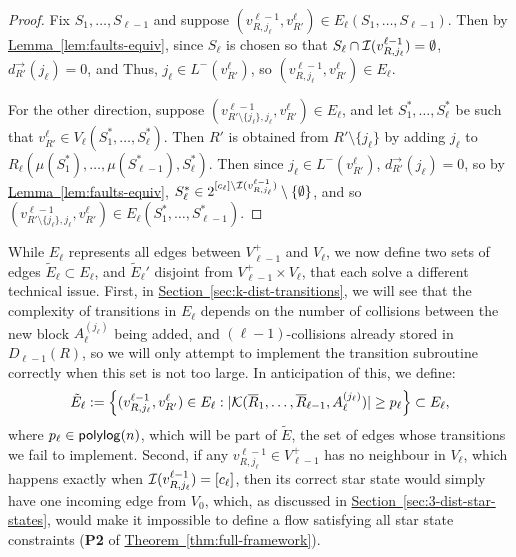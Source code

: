 \documentclass{theoretics}
\renewcommand{\sec}[1]{\hyperref[sec:#1]{Section~\ref*{sec:#1}}}
\newcommand{\thm}[1]{\hyperref[thm:#1]{Theorem~\ref*{thm:#1}}}
\newcommand{\lem}[1]{\hyperref[lem:#1]{Lemma~\ref*{lem:#1}}}
\renewcommand{\>}{\rangle}
\newcommand{\<}{\langle}
\renewcommand{\(}{\left(}
\renewcommand{\)}{\right)}
\begin{document}
\begin{proof}
Fix $S_1,\dots,S_{\ell-1}$ and suppose $(v_{R,j_{\ell}}^{\ell-1},v_{R'}^{\ell})\in {E}_{\ell}(S_1,\dots,S_{\ell-1})$. Then by \lem{faults-equiv}, since $S_{\ell}$ is chosen so that $S_{\ell}\cap {\cal I}(v_{R,j_{\ell}}^{\ell-1})=\emptyset$,
$d_{R'}^{\rightarrow}(j_{\ell})=0$, and Thus, $j_{\ell}\in L^-(v_{R'}^{\ell})$, so $(v_{R,j_{\ell}}^{\ell-1},v_{R'}^{\ell})\in E_{\ell}$.


For the other direction, suppose $\left(v^{\ell-1}_{R'\setminus\{j_{\ell}\},j_{\ell}},v^{\ell}_{R'}\right)\in E_{\ell}$, and let $S_1^*,\dots,S_{\ell}^*$ be such that $v^{\ell}_{R'}\in V_{\ell}(S_1^*,\dots,S_{\ell}^*)$. Then $R'$ is obtained from $R'\setminus\{j_{\ell}\}$ by adding $j_{\ell}$ to $R_{\ell}(\mu(S_1^*),\dots,\mu(S_{\ell-1}^*),S_{\ell}^*)$. Then since $j_{\ell}\in L^-(v_{R'}^{\ell})$, $d_{R'}^{\rightarrow}(j_{\ell})=0$, so by \lem{faults-equiv}, $S_{\ell}^*\in 2^{[c_{\ell}]\setminus{\cal I}(v_{R,j_{\ell}}^{\ell-1})}\setminus\{\emptyset\}$, and so $\left(v^{\ell-1}_{R'\setminus\{j_{\ell}\},j_{\ell}},v^{\ell}_{R'}\right)\in E_{\ell}(S_1^*,\dots,S_{\ell-1}^*)$.
\end{proof}
While $E_{\ell}$ represents all edges between $V_{\ell-1}^{+}$ and $V_{\ell}$, we now define two sets of edges $\tilde{E}_{\ell}\subset E_{\ell}$, and $\tilde{E}_{\ell}'$ disjoint from $V_{\ell-1}^+\times V_{\ell}$, that each solve a different technical issue. First, in \sec{k-dist-transitions}, we will see that the complexity of transitions in $E_{\ell}$ depends on the number of collisions between the new block $A_{\ell}^{(j_{\ell})}$ being added, and $(\ell-1)$-collisions already stored in $D_{\ell-1}(R)$, so we will only attempt to implement the transition subroutine correctly when this set is not too large. In anticipation of this, we define:
\begin{equation}
	\tilde{E}_{\ell}:=\left\{(v^{\ell-1}_{R,j_{\ell}},v^{\ell}_{R'})\in E_{\ell}: |{\cal K}(\overline{R}_1,\dots,\overline{R}_{\ell-1},A_{\ell}^{(j_{\ell})})| \geq p_{\ell}
	\right\}\subset E_{\ell},\label{eq:k-dist-tilde-E-ell}
\end{equation}
where $p_{\ell}\in {\sf polylog}(n)$,
which will be part of $\tilde{E}$, the set of edges whose transitions we fail to implement. 
Second, if any $v_{R,j_{\ell}}^{\ell-1}\in V_{\ell-1}^+$ has no neighbour in $V_{\ell}$, which happens exactly when ${\cal I}(v_{R,j_{\ell}}^{\ell-1})=[c_{\ell}]$, then its correct star state would simply have one incoming edge from $V_0$, which, as discussed in \sec{3-dist-star-states}, would make it impossible to define a flow satisfying all star state constraints (\textbf{P2} of \thm{full-framework}).
\end{document}
